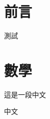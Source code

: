 \documentclass{article}
\begin{document}
\section{前言}
測試

\section{數學}
這是一段中文

\vspace{0.5cm}

中文
\end{document}
